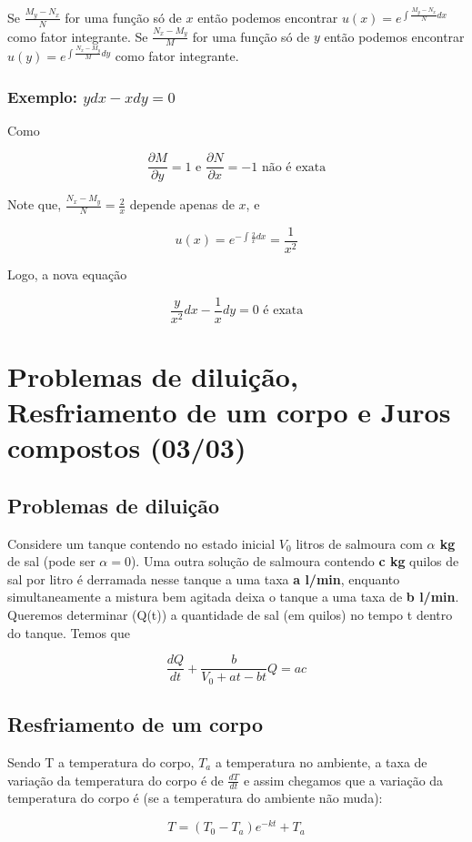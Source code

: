 \documentclass[12pt]{article}
\begin{document}
Se $\frac{M_y - N_x}{N}$ for uma função só de $x$ então podemos encontrar $u(x) = e^{\int \frac{M_y - N_x}{N} d x}$ como fator integrante. Se $\frac{N_x - M_y}{M}$ for uma função só de $y$ então podemos encontrar $u(y) = e^{\int \frac{N_x - M_y}{M} d y}$ como fator integrante.

\subsubsection*{Exemplo: $y d x - x d y = 0$}
Como

$$\dfrac{\partial M}{\partial y} = 1 \text{ e } \dfrac{\partial N}{\partial x} = -1 \text{ não é exata}$$

Note que, $\frac{N_x - M_y}{N} = \frac{2}{x}$ depende apenas de $x$, e

$$u(x) = e^{-\int \frac{2}{x} d x} = \dfrac{1}{x^2}$$

Logo, a nova equação

$$\dfrac{y}{x^2} d x - \dfrac{1}{x} d y = 0 \text{ é exata}$$

\section{Problemas de diluição, Resfriamento de um corpo e Juros compostos (03/03)}
\subsection*{Problemas de diluição}
Considere um tanque contendo no estado inicial $V_0$ litros de salmoura com \textbf{$\alpha$ kg} de sal (pode ser $\alpha = 0$).
Uma outra solução de salmoura contendo \textbf{c kg} quilos de sal por litro é derramada nesse tanque a uma taxa \textbf{a l/min}, enquanto simultaneamente a mistura bem agitada deixa o tanque a uma taxa de \textbf{b l/min}. Queremos determinar (Q(t)) a quantidade de sal (em quilos) no tempo t dentro do tanque. Temos que

$$\dfrac{d Q}{d t} + \dfrac{b}{V_0 + a t - b t} Q = a c$$

\subsection*{Resfriamento de um corpo}
Sendo T a temperatura do corpo, $T_a$ a temperatura no ambiente, a taxa de variação da temperatura do corpo é de $\frac{d T}{d t}$ e assim chegamos que a variação da temperatura do corpo é (se a temperatura do ambiente não muda):

$$T = (T_0 - T_a) e^{-k t} + T_a$$
\end{document}
